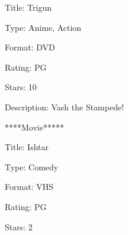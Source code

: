 \noindent 
{\fontsize{10pt}{10pt}\selectfont Title: Trigun} \par
\noindent 
{\fontsize{10pt}{10pt}\selectfont Type: Anime, Action} \par
\noindent 
{\fontsize{10pt}{10pt}\selectfont Format: DVD} \par
\noindent 
{\fontsize{10pt}{10pt}\selectfont Rating: PG} \par
\noindent 
{\fontsize{10pt}{10pt}\selectfont Stars: 10} \par
\noindent 
{\fontsize{10pt}{10pt}\selectfont Description: Vash the Stampede!} \par
\noindent 
{\fontsize{10pt}{10pt}\selectfont *****Movie*****} \par
\noindent 
{\fontsize{10pt}{10pt}\selectfont Title: Ishtar} \par
\noindent 
{\fontsize{10pt}{10pt}\selectfont Type: Comedy} \par
\noindent 
{\fontsize{10pt}{10pt}\selectfont Format: VHS} \par
\noindent 
{\fontsize{10pt}{10pt}\selectfont Rating: PG} \par
\noindent 
{\fontsize{10pt}{10pt}\selectfont Stars: 2} \par
\noindent 
\vspace{10pt}

